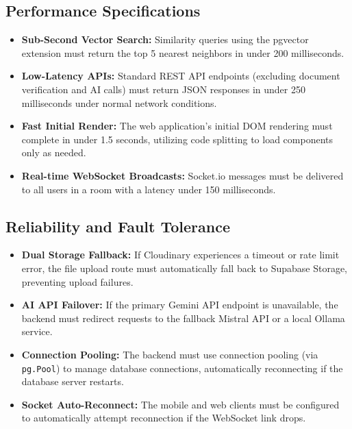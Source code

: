 \documentclass[12,Times new Roman,a4paper]{report}
\begin{document}
\subsection{Performance Specifications}
\begin{itemize}
    \item \textbf{Sub-Second Vector Search:} Similarity queries using the pgvector extension must return the top 5 nearest neighbors in under 200 milliseconds.
    \item \textbf{Low-Latency APIs:} Standard REST API endpoints (excluding document verification and AI calls) must return JSON responses in under 250 milliseconds under normal network conditions.
    \item \textbf{Fast Initial Render:} The web application's initial DOM rendering must complete in under 1.5 seconds, utilizing code splitting to load components only as needed.
    \item \textbf{Real-time WebSocket Broadcasts:} Socket.io messages must be delivered to all users in a room with a latency under 150 milliseconds.
\end{itemize}

\subsection{Reliability and Fault Tolerance}
\begin{itemize}
    \item \textbf{Dual Storage Fallback:} If Cloudinary experiences a timeout or rate limit error, the file upload route must automatically fall back to Supabase Storage, preventing upload failures.
    \item \textbf{AI API Failover:} If the primary Gemini API endpoint is unavailable, the backend must redirect requests to the fallback Mistral API or a local Ollama service.
    \item \textbf{Connection Pooling:} The backend must use connection pooling (via \texttt{pg.Pool}) to manage database connections, automatically reconnecting if the database server restarts.
    \item \textbf{Socket Auto-Reconnect:} The mobile and web clients must be configured to automatically attempt reconnection if the WebSocket link drops.
\end{itemize}
\end{document}
